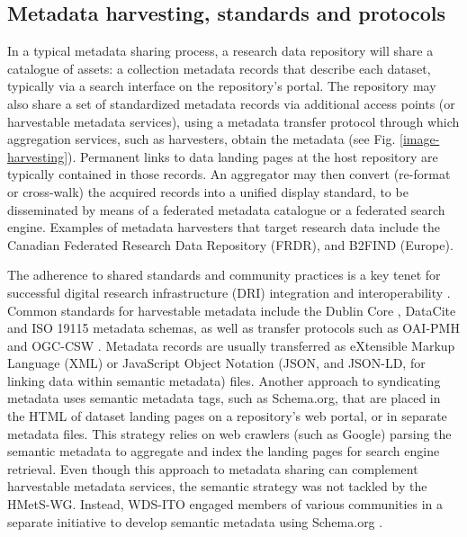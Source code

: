 \documentclass{interact}
\begin{document}
\subsection*{Metadata harvesting, standards and protocols}\label{subintro}
In a typical metadata sharing process, a research data repository will share a catalogue of assets: a collection metadata records that describe each dataset, typically via a search interface on the repository's portal. The repository may also share a set of standardized metadata records via additional access points (or harvestable metadata services), using a metadata transfer protocol through which aggregation services, such as harvesters, obtain the metadata (see Fig. \ref{image-harvesting}). Permanent links to data landing pages at the host repository are typically contained in those records. An aggregator may then convert (re-format or cross-walk) the acquired records into a unified display standard, to be disseminated by means of a federated metadata catalogue or a federated search engine. Examples of metadata harvesters that target research data include the Canadian Federated Research Data Repository (FRDR), and B2FIND (Europe).

The adherence to shared standards and community practices is a key tenet for successful digital research infrastructure (DRI) integration and interoperability \parencite{dietze_iterative_2018, yu_coevolution_2021, waide_demystifying_2017}. Common standards for harvestable metadata include the Dublin Core \parencite{dcmi_dublin_2020}, DataCite \parencite{datacite_metadata_working_group_datacite_2019} and ISO 19115 \parencite{iso_iso_2019} metadata schemas, as well as transfer protocols such as OAI-PMH \parencite{lagoze_open_2015} and OGC-CSW \parencite{nebert_ogc_2016}. Metadata records are usually transferred as eXtensible Markup Language (XML) or JavaScript Object Notation (JSON, and JSON-LD, for linking data within semantic metadata) files.  Another approach to syndicating metadata uses semantic metadata tags, such as Schema.org, that are placed in the HTML of dataset landing pages on a repository's web portal, or in separate metadata files. This strategy relies on web crawlers (such as Google) parsing the semantic metadata to aggregate and index the landing pages for search engine retrieval. Even though this approach to metadata sharing can complement harvestable metadata services, the semantic strategy was not tackled by the HMetS-WG. Instead, WDS-ITO engaged members of various communities in a separate initiative to develop semantic metadata using Schema.org \parencite{payne_how_2022}.
\end{document}
